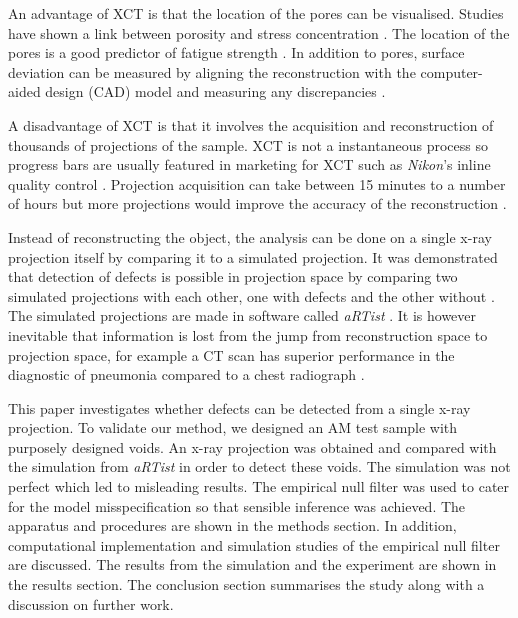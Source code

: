 \documentclass{article}
\begin{document}
An advantage of XCT is that the location of the pores can be visualised. Studies have shown a link between porosity and stress concentration \citep{carlton2016damage, leuders2015fatigue, siddique2015computed}. The location of the pores is a good predictor of fatigue strength \citep{leuders2015fatigue}. In addition to pores, surface deviation can be measured by aligning the reconstruction with the computer-aided design (CAD) model and measuring any discrepancies \citep{kim2016inspection, lee2015compliance, villarraga2015assessing}.

A disadvantage of XCT is that it involves the acquisition and reconstruction of thousands of projections of the sample. XCT is not a instantaneous process so progress bars are usually featured in marketing for XCT such as \emph{Nikon}'s inline quality control \citep{nikon2015inline}. Projection acquisition can take between 15 minutes to a number of hours \citep{warnett2016towards} but more projections would improve the accuracy of the reconstruction \citep{kruth2011computed}.

Instead of reconstructing the object, the analysis can be done on a single x-ray projection itself by comparing it to a simulated projection. It was demonstrated that detection of defects is possible in projection space by comparing two simulated projections with each other, one with defects and the other without \citep{brierley2018optimized}. The simulated projections are made in software called \emph{aRTist} \citep{bellon2012radiographic, bellon2007artist, jaenisch2008artist}. It is however inevitable that information is lost from the jump from reconstruction space to projection space, for example a CT scan has superior performance in the diagnostic of pneumonia compared to a chest radiograph \citep{hayden2009chest}.

This paper investigates whether defects can be detected from a single x-ray projection. To validate our method, we designed an AM test sample with purposely designed voids. An x-ray projection was obtained and compared with the simulation from \emph{aRTist} in order to detect these voids. The simulation was not perfect which led to misleading results. The empirical null filter was used to cater for the model misspecification so that sensible inference was achieved. The apparatus and procedures are shown in the methods section. In addition, computational implementation and simulation studies of the empirical null filter are discussed. The results from the simulation and the experiment are shown in the results section. The conclusion section summarises the study along with a discussion on further work.
\end{document}
